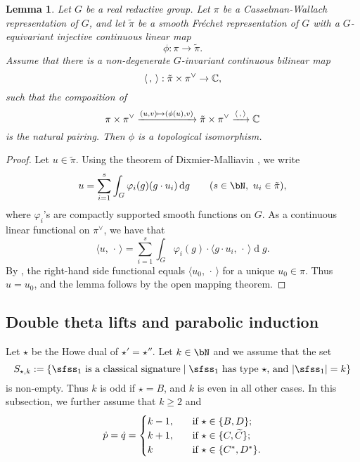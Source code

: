 \documentclass[12pt,a4paper]{amsart}
\def\abs#1{\left|{#1}\right|}
\newcommand{\od}{\operatorname{d}}
\newcommand{\la}{\langle}
\newcommand{\ra}{\rangle}
\newcommand{\be}{\begin {equation}}
\newcommand{\ee}{\end {equation}}
\numberwithin{equation}{section}
\newtheorem{lem}[thm]{Lemma}
\theoremstyle{remark}
\begin{document}
\begin{lem}\label{imb2}
Let $G$ be a real reductive group. Let $\pi$ be a Casselman-Wallach representation of $G$, and let $\tilde \pi$ be a smooth Fr\'echet representation of $G$ with a $G$-equivariant injective continuous linear map
\[
  \phi: \pi\rightarrow \tilde \pi.
\]
Assume that  there is a non-degenerate $G$-invariant continuous bilinear map
\[
\la\,,\,\ra: \tilde \pi\times \pi^\vee\rightarrow \C,
\]
such that the composition of
\[
 \pi\times \pi^\vee\xrightarrow{(u,v)\mapsto (\phi(u),v)} \tilde \pi\times \pi^\vee\xrightarrow{\la\,,\,\ra} \C
\]
is the natural pairing. Then $\phi$ is a topological isomorphism.
\end{lem}
\begin{proof}
 Let $u\in \tilde \pi$.
 Using the theorem of Dixmier-Malliavin \cite[Theorem 3.3]{DM}, we write
 \[
   u=\sum_{i=1}^{s} \int_G \varphi_i(g) ( g\cdot u_i)\od\! g \qquad (s\in \bN, \ u_i\in\tilde \pi),
 \]
 where $\varphi_i$'s are compactly supported smooth functions on $G$.  As a continuous linear functional on $\pi^\vee$, we have that
  \[
   \la u,\, \cdot\, \ra=\sum_{i=1}^{s} \int_G \varphi_i(g)  \cdot \la g\cdot u_i, \,\cdot\,\ra \od\! g.
 \]
By \cite[Lemma 3.5]{SZ1},  the right-hand side  functional  equals  $\la u_0, \,\cdot\,\ra$ for a unique $u_0\in \pi$. Thus $u=u_0$, and the lemma follows by the open mapping theorem.
\end{proof}



\subsection{Double theta lifts and parabolic induction}\label{doublep}
Let $\star$ be the Howe dual of $\star'=\star''$. Let $k\in \bN$ and we assume that the set
\[
 S_{\star, k}:=\{ \textrm{$\sfss_1$ is a classical signature}\mid \textrm{$\sfss_1$ has type $\star$, and $\abs{\sfss_1}=k$}\}
\]
is non-empty. Thus $k$ is odd if $\star=B$, and $k$ is even in all other cases. 
In this subsection, we further assume that $k\geq 2$ and
\be\label{dotp}
 \dot p=\dot q= \begin{cases}
 k-1,\quad   &\textrm{if } \star\in \{B,D\};\\
k+1,  & \textrm{if $\star\in \{C, \widetilde C\}$;}\\
k & \textrm{if $ \star\in\{C^*,D^*\}$.}
\end{cases}
 \ee
\end{document}
